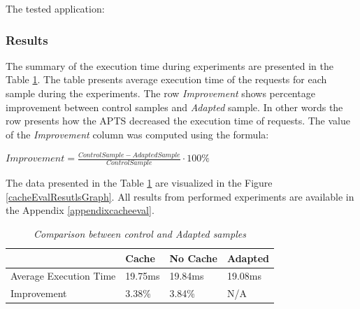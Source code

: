 \documentclass[12pt,a4paper]{article}
\begin{document}
\vspace{1mm}\noindent{}\vspace{1mm}

The tested application:

\vspace{1mm}\noindent{}\vspace{1mm}
 

\subsubsection{Results} 

The summary of the execution time during experiments are presented in the Table \ref{cacheCompResutls}. The table presents average execution time of the requests for each sample during the experiments. The row \textit{Improvement} shows percentage improvement between control samples and \textit{Adapted} sample. In other words the row presents how the APTS decreased the execution time of requests. The value of the \textit{Improvement} column was computed using the formula: 

\begin{center}
$Improvement = \frac{ControlSample - AdaptedSample}{ControlSample} \cdot 100\%$
\end{center}

The data presented in the Table \ref{cacheCompResutls} are visualized in the Figure \ref{cacheEvalResutlsGraph}.  All results from performed experiments are available in the Appendix \ref{appendixcacheeval}. 

\begin{table}[!htb]
\caption{\textit{Comparison between control and Adapted samples}} \label{cacheCompResutls}
\begin{tabularx}{\textwidth}{p{4cm}|X|X|X}
 & \textbf{Cache} & \textbf{No Cache} & \textbf{Adapted} \\ \hline
Average Execution Time &  19.75ms & 19.84ms & 19.08ms\\ \hline
Improvement &  3.38\% & 3.84\% & N/A\\ 
\end{tabularx}
\end{table}
\end{document}
